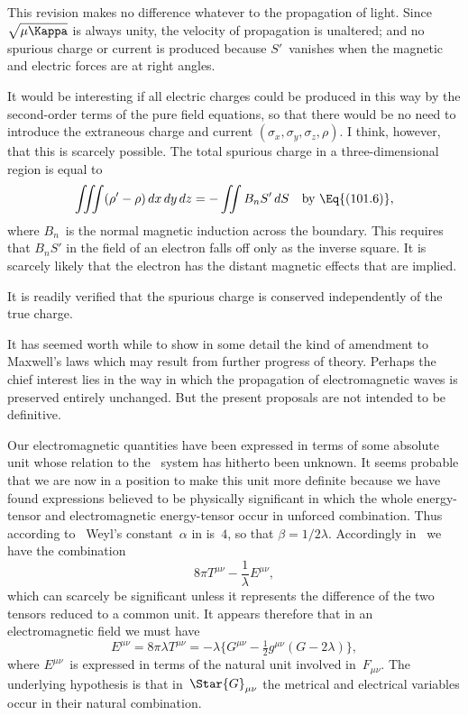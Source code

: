 \documentclass[12pt]{book}
\begin{document}
This revision makes no difference whatever to the propagation of light.
Since $\sqrt{\mu\Kappa}$ is always unity, the velocity of propagation is unaltered; and no
spurious charge or current is produced because $S'$~vanishes when the magnetic
and electric forces are at right angles.

It would be interesting if all electric charges could be produced in this
way by the second\hyp{}order terms of the pure field equations, so that there would
be no need to introduce the extraneous charge and current $(\sigma_{x}, \sigma_{y}, \sigma_{z}, \rho)$.
I think, however, that this is scarcely possible. The total spurious charge in
a three\hyp{}dimensional region is equal to
\[
\iiint (\rho' - \rho)\, dx\, dy\, dz
= -\iint B_{n}S'\, dS\quad\text{by~\Eq{(101.6)},}
\]
where $B_{n}$~is the normal magnetic induction across the boundary. This requires
that $B_{n}S'$ in the field of an electron falls off only as the inverse square. It is
scarcely likely that the electron has the distant magnetic effects that are implied.

It is readily verified that the spurious charge is conserved independently
of the true charge.

It has seemed worth while to show in some detail the kind of amendment
to Maxwell's laws which may result from further progress of theory. Perhaps
the chief interest lies in the way in which the propagation of electromagnetic
waves is preserved entirely unchanged. But the present proposals are not
intended to be definitive.


Our electromagnetic quantities have been expressed in terms of some
absolute unit whose relation to the \CGS\ system has hitherto been unknown.
It seems probable that we are now in a position to make this unit more
definite because we have found expressions believed to be physically significant
in which the whole energy\hyp{}tensor and electromagnetic energy\hyp{}tensor
occur in unforced combination. Thus according to~ Weyl's constant~$\alpha$
in  is~$4$, so that $\beta = 1/2\lambda$. Accordingly in~ we have the combination
\[
8\pi T^{\mu\nu} - \frac{1}{\lambda} E^{\mu\nu},
\]
which can scarcely be significant unless it represents the difference of the two
tensors reduced to a common unit. It appears therefore that in an electromagnetic
field we must have
\[
E^{\mu\nu} = 8\pi\lambda T^{\mu\nu}
= -\lambda\bigl\{G^{\mu\nu} - \tfrac{1}{2} g^{\mu\nu}(G - 2\lambda)\bigr\},
\]
where $E^{\mu\nu}$~is expressed in terms of the natural unit involved in~$F_{\mu\nu}$. The
underlying hypothesis is that in~$\Star{G}_{\mu\nu}$ the metrical and electrical variables
occur in their natural combination.
\end{document}

